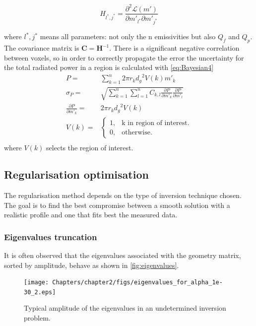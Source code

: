 \begin{equation}
H_{l^*,j^*} = \frac{\partial^2 \mathcal{L}(m')}{\partial m'_{l^*} \partial m'_{j^*}}
\label{eq:Bayesian3}
\end{equation}

where $l^*,j^*$ means all parameters: not only the n emissivities but also $Q_f$ and $Q_p$. The covariance matrix is $\bm{C}=\bm{H}^{-1}$. There is a significant negative correlation between voxels, so in order to correctly propagate the error the uncertainty for the total radiated power in a region is calculated with \autoref{eq:Bayesian4}
\begin{equation}
\label{eq:Bayesian4}
\begin{aligned}
P =& \sum_{k=1}^{n} 2\pi r_k {d_g}^2 V(k) m'_k \\
\sigma_{P} =& \sqrt{ \sum_{k=1}^{n} \sum_{l=1}^{n} C_{k,l} \frac{\partial P}{\partial m'_k} \frac{\partial P}{\partial m'_l}} \\
\frac{\partial P}{\partial m'_k} =& 2\pi r_k {d_g}^2 V(k) \\
V(k) =& \begin{cases}
    1, & \text{k in region of interest}.\\
    0, & \text{otherwise}.
    \end{cases} \\
\end{aligned}
\end{equation}
where $V(k)$ selects the region of interest.


\subsection{Regularisation optimisation}\label{Regularisation_optimisation}
The regularisation method depends on the type of inversion technique chosen. The goal is to find the best compromise between a smooth solution with a realistic profile and one that fits best the measured data.

\subsubsection{Eigenvalues truncation}
It is often observed that the eigenvalues associated with the geometry matrix, sorted by amplitude, behave as shown in \autoref{fig:eigenvalues}.

\begin{figure}[!ht]
	\centering
	\texttt{[image: Chapters/chapter2/figs/eigenvalues\_for\_alpha\_1e-30\_2.eps]}
	\caption{Typical amplitude of the eigenvalues in an undetermined inversion problem.}
	\label{fig:eigenvalues}
\end{figure}

